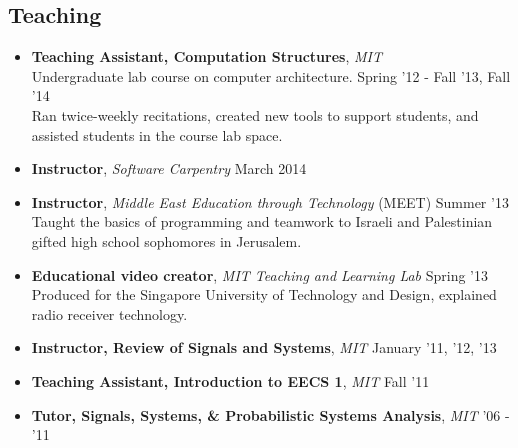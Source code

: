 \documentclass[margin]{res}
\begin{document}
\begin{resume}
\section{Teaching}
\begin{itemize}[leftmargin=*] %
\item {\bf Teaching Assistant, Computation Structures}, {\it MIT} \\Undergraduate lab course on computer architecture. \hfill Spring '12 - Fall '13, Fall '14 \\Ran twice-weekly recitations, created new tools to support students, and assisted students in the course lab space.  
\item {\bf Instructor}, {\it Software Carpentry} \hfill March 2014 \\ 
\item {\bf Instructor}, {\it Middle East Education through Technology} (MEET) \hfill Summer '13 \\ Taught the basics of programming and teamwork to Israeli and Palestinian gifted high school sophomores in Jerusalem.
\item {\bf Educational video creator}, {\it MIT Teaching and Learning Lab} \hfill Spring '13 \\
Produced for the Singapore University of Technology and Design, explained radio receiver technology.
\item {\bf Instructor, Review of Signals and Systems}, {\it MIT} \hfill January '11, '12, '13 %
\item {\bf Teaching Assistant, Introduction to EECS 1}, {\it MIT} \hfill Fall '11 %

\item {\bf Tutor, Signals, Systems, \& Probabilistic Systems Analysis}, {\it MIT} \hfill '06 - '11 %
\end{itemize}





\end{resume}
\end{document}
